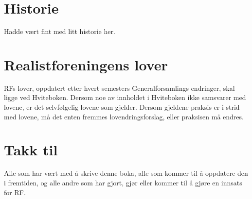 \documentclass[11pt,norsk,a4paper,pointlessnumbers]{scrbook}
\begin{document}


\chapter{Historie}
Hadde vært fint med litt historie her.

\chapter{Realistforeningens lover}
RFs lover, oppdatert etter hvert semesters Generalforsamlings 
endringer, skal ligge ved Hviteboken. Dersom noe av innholdet
i Hviteboken ikke samsvarer med lovene, er det selvfølgelig
lovene som gjelder. Dersom gjeldene praksis er i strid med
lovene, må det enten fremmes lovendringsforslag, eller praksisen
må endres.


\chapter{Takk til}
Alle som har vært med å skrive denne boka, alle som kommer til å oppdatere den i fremtiden, og alle andre som har gjort, gjør eller kommer til å gjøre en innsats for RF.


%
\end{document}
